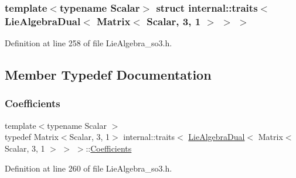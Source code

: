 \subsubsection*{template$<$typename Scalar$>$\newline
struct internal\+::traits$<$ Lie\+Algebra\+Dual$<$ Matrix$<$ Scalar, 3, 1 $>$ $>$ $>$}



Definition at line 258 of file Lie\+Algebra\+\_\+so3.\+h.



\subsection{Member Typedef Documentation}
\hypertarget{structinternal_1_1traits_3_01_lie_algebra_dual_3_01_matrix_3_01_scalar_00_013_00_011_01_4_01_4_01_4_a80495946885356581543f8de93844103}{}\label{structinternal_1_1traits_3_01_lie_algebra_dual_3_01_matrix_3_01_scalar_00_013_00_011_01_4_01_4_01_4_a80495946885356581543f8de93844103} 
\subsubsection{\texorpdfstring{Coefficients}{Coefficients}}
{\footnotesize\ttfamily template$<$typename Scalar $>$ \\
typedef Matrix$<$Scalar, 3, 1$>$ internal\+::traits$<$ \hyperlink{class_lie_algebra_dual}{Lie\+Algebra\+Dual}$<$ Matrix$<$ Scalar, 3, 1 $>$ $>$ $>$\+::\hyperlink{structinternal_1_1traits_3_01_lie_algebra_dual_3_01_matrix_3_01_scalar_00_013_00_011_01_4_01_4_01_4_a80495946885356581543f8de93844103}{Coefficients}}



Definition at line 260 of file Lie\+Algebra\+\_\+so3.\+h.

\hypertarget{structinternal_1_1traits_3_01_lie_algebra_dual_3_01_matrix_3_01_scalar_00_013_00_011_01_4_01_4_01_4_a05cfaae13397aaf0d8ece656959c0bfb}{}\label{structinternal_1_1traits_3_01_lie_algebra_dual_3_01_matrix_3_01_scalar_00_013_00_011_01_4_01_4_01_4_a05cfaae13397aaf0d8ece656959c0bfb} 
